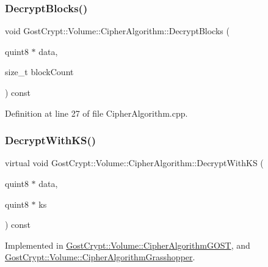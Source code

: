 \mbox{\label{class_gost_crypt_1_1_volume_1_1_cipher_algorithm_a0854cec4afed33f1903ab9a37f70e1dd}} 
\subsubsection{\texorpdfstring{Decrypt\+Blocks()}{DecryptBlocks()}}
{\footnotesize\ttfamily void Gost\+Crypt\+::\+Volume\+::\+Cipher\+Algorithm\+::\+Decrypt\+Blocks (\begin{DoxyParamCaption}\item[{quint8 $\ast$}]{data,  }\item[{size\+\_\+t}]{block\+Count }\end{DoxyParamCaption}) const\hspace{0.3cm}{\ttfamily [virtual]}}



Definition at line 27 of file Cipher\+Algorithm.\+cpp.

\mbox{\label{class_gost_crypt_1_1_volume_1_1_cipher_algorithm_aa08e6b739411e759a0489668e818e08b}} 
\subsubsection{\texorpdfstring{Decrypt\+With\+K\+S()}{DecryptWithKS()}}
{\footnotesize\ttfamily virtual void Gost\+Crypt\+::\+Volume\+::\+Cipher\+Algorithm\+::\+Decrypt\+With\+KS (\begin{DoxyParamCaption}\item[{quint8 $\ast$}]{data,  }\item[{quint8 $\ast$}]{ks }\end{DoxyParamCaption}) const\hspace{0.3cm}{\ttfamily [pure virtual]}}



Implemented in \hyperlink{class_gost_crypt_1_1_volume_1_1_cipher_algorithm_g_o_s_t_a416b83c6f9605fc342e3f0f3dd7c307c}{Gost\+Crypt\+::\+Volume\+::\+Cipher\+Algorithm\+G\+O\+ST}, and \hyperlink{class_gost_crypt_1_1_volume_1_1_cipher_algorithm_grasshopper_a4a5845fc432ef4c16bf94b0c6d5973e2}{Gost\+Crypt\+::\+Volume\+::\+Cipher\+Algorithm\+Grasshopper}.


